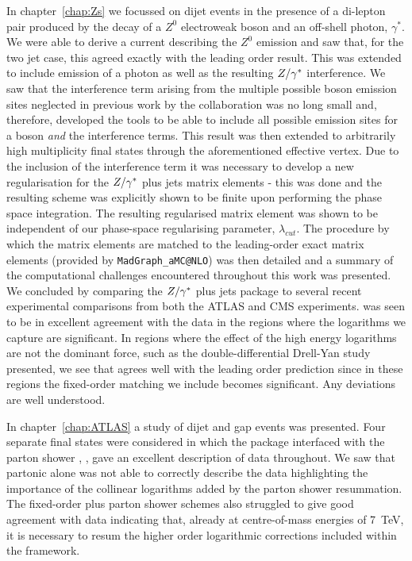 In chapter~\ref{chap:Zs} we focussed on dijet events in the presence of a di-lepton pair produced by
the decay of a $Z^0$ electroweak boson and an off-shell photon, $\gamma^*$.  We were able to derive a
current describing the $Z^0$ emission and saw that, for the two jet case, this agreed exactly with the
leading order result.  This was extended to include emission of a photon as well as the resulting $Z/\gamma^*$ interference.
We saw that the interference term arising from the multiple possible boson emission sites neglected in previous work by the \hej collaboration was no long small
and, therefore, developed the tools to be able to include all possible emission sites for a boson \emph{and}
the interference terms.  This result was then extended to arbitrarily high multiplicity final states through
the aforementioned effective vertex.  Due to the inclusion of the interference term it was necessary
to develop a new regularisation for the $Z/\gamma^*$ plus jets matrix elements - this was done and the resulting
scheme was explicitly shown to be finite upon performing the phase space integration.  The resulting
regularised matrix element was shown to be independent of our phase-space regularising
parameter, $\lambda_{cut}$.  The procedure by which the \HEJ matrix elements are matched to the leading-order
exact matrix elements (provided by \texttt{MadGraph\_aMC@NLO}) was then detailed and a summary of the computational
challenges encountered throughout this work was presented.  We concluded by comparing the \HEJ $Z/\gamma^*$ plus jets
package to several recent experimental comparisons from both the ATLAS and CMS experiments.  \HEJ was seen to
be in excellent agreement with the data in the regions where the logarithms we capture are significant.
In regions where the effect of the high energy logarithms are not the dominant force, such as the double-differential
Drell-Yan study presented, we see that \HEJ agrees well with the leading order prediction since in these
regions the fixed-order matching we include becomes significant.  Any deviations are well understood.

In chapter~\ref{chap:ATLAS} a study of dijet and gap events was presented.  Four separate final states
were considered in which the \HEJ package interfaced with the parton shower \ARIADNE, \HEJA, gave an
excellent description of data throughout.  We saw that partonic \HEJ alone was not able to correctly
describe the data highlighting the importance of the collinear logarithms added by the parton shower
resummation.  The fixed-order plus parton shower schemes also struggled to give good agreement with
data indicating that, already at centre-of-mass energies of 7~TeV, it is necessary to resum the higher
order logarithmic corrections included within the \hej framework.

